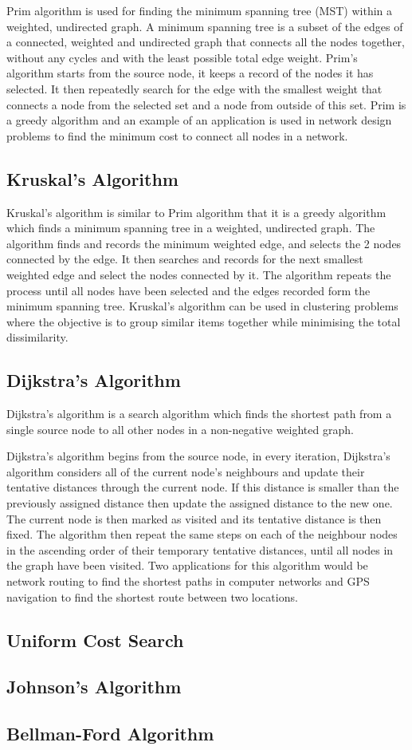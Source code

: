 Prim algorithm is used for finding the minimum spanning tree (MST) within a weighted, undirected graph. A minimum spanning tree is a subset of the edges of a connected, weighted and undirected graph that connects all the nodes together, without any cycles and with the least possible total edge weight. Prim's algorithm starts from the source node, it keeps a record of the nodes it has selected. It then repeatedly search for the edge with the smallest weight that connects a node from the selected set and a node from outside of this set. Prim is a greedy algorithm and an example of an application is used in network design problems to find the minimum cost to connect all nodes in a network.

\subsection{Kruskal's Algorithm}

Kruskal's algorithm is similar to Prim algorithm that it is a greedy algorithm which finds a minimum spanning tree in a weighted, undirected graph. The algorithm finds and records the minimum weighted edge, and selects the 2 nodes connected by the edge. It then searches and records for the next smallest weighted edge and select the nodes connected by it. The algorithm repeats the process until all nodes have been selected and the edges recorded form the minimum spanning tree. Kruskal's algorithm can be used in clustering problems where the objective is to group similar items together while minimising the total dissimilarity.

\subsection{Dijkstra's Algorithm} \label{dijkstra}

Dijkstra's algorithm is a search algorithm which finds the shortest path from a single source node to all other nodes in a non-negative weighted graph.

Dijkstra's algorithm begins from the source node, in every iteration, Dijkstra's algorithm considers all of the current node's neighbours and update their tentative distances through the current node. If this distance is smaller than the previously assigned distance then update the assigned distance to the new one. The current node is then marked as visited and its tentative distance is then fixed. The algorithm then repeat the same steps on each of the neighbour nodes in the ascending order of their temporary tentative distances, until all nodes in the graph have been visited. Two applications for this algorithm would be network routing to find the shortest paths in computer networks and GPS navigation to find the shortest route between two locations.

\subsection{Uniform Cost Search}

\subsection{Johnson's Algorithm}

\subsection{Bellman-Ford Algorithm}
